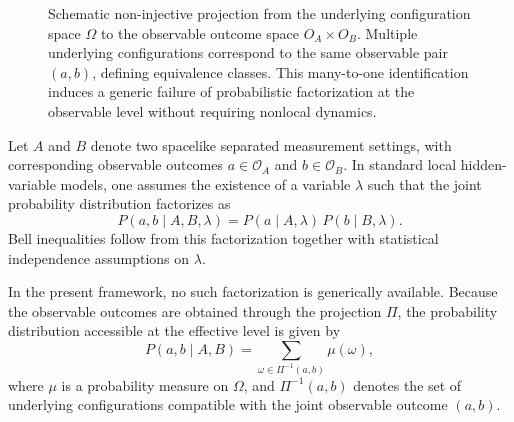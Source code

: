 \begin{figure}[t]
    \caption{Schematic non-injective projection from the underlying configuration space
      $\Omega$ to the observable outcome space $O_A \times O_B$.
      Multiple underlying configurations correspond to the same observable pair $(a,b)$,
      defining equivalence classes.
      This many-to-one identification induces a generic failure of probabilistic factorization
      at the observable level without requiring nonlocal dynamics.}
    \label{fig:non-injective-projection}
  \end{figure}

  Let $A$ and $B$ denote two spacelike separated measurement settings, with corresponding
  observable outcomes $a \in \mathcal{O}_A$ and $b \in \mathcal{O}_B$.
  In standard local hidden-variable models, one assumes the existence of a variable
  $\lambda$ such that the joint probability distribution factorizes as
  \begin{equation}
    P(a,b \mid A,B,\lambda) = P(a \mid A,\lambda)\,P(b \mid B,\lambda).
  \end{equation}
  Bell inequalities follow from this factorization together with statistical independence
  assumptions on $\lambda$.

  In the present framework, no such factorization is generically available.
  Because the observable outcomes are obtained through the projection $\Pi$, the
  probability distribution accessible at the effective level is given by
  \begin{equation}
    P(a,b \mid A,B) =
    \sum_{\omega \in \Pi^{-1}(a,b)}
    \mu(\omega),
  \end{equation}
  where $\mu$ is a probability measure on $\Omega$, and $\Pi^{-1}(a,b)$ denotes the
  set of underlying configurations compatible with the joint observable outcome $(a,b)$.

